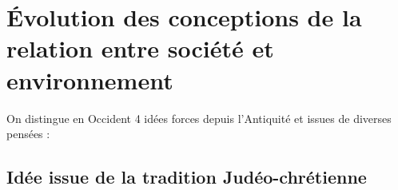 \section{Évolution des conceptions de la relation entre société et environnement}

On distingue en Occident 4 idées forces depuis l’Antiquité et issues de diverses
pensées :

\subsection{Idée issue de la tradition Judéo-chrétienne}
